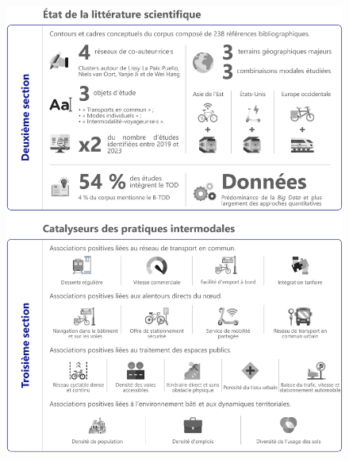 \begin{refsegment}
\begin{figure}[h!]\vspace*{4pt}
        \caption*{}
        \label{graphical-abstract-chap2}
        \centerline{\includegraphics[width=1\columnwidth]{src/Figures/Graphical-abstract/FR_Graphical_abstract_chap2.pdf}}
        \vspace{5pt}
    \end{figure}


\end{refsegment}
